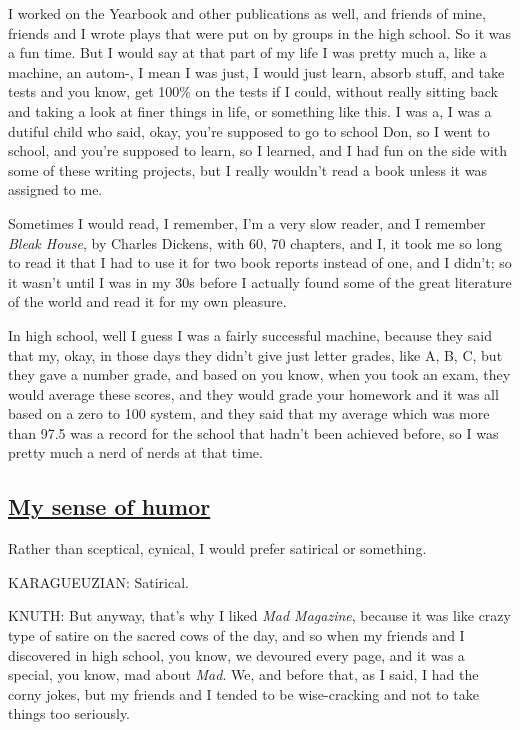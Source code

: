 \documentclass[]{article}
\begin{document}
I worked on the Yearbook and other publications as well, and friends of
mine, friends and I wrote plays that were put on by groups in the high
school. So it was a fun time. But I would say at that part of my life I
was pretty much a, like a machine, an autom-, I mean I was just, I would
just learn, absorb stuff, and take tests and you know, get 100\% on the
tests if I could, without really sitting back and taking a look at finer
things in life, or something like this. I was a, I was a dutiful child
who said, okay, you're supposed to go to school Don, so I went to
school, and you're supposed to learn, so I learned, and I had fun on the
side with some of these writing projects, but I really wouldn't read a
book unless it was assigned to me.

Sometimes I would read, I remember, I'm a very slow reader, and I
remember \emph{Bleak House}, by Charles Dickens, with 60, 70 chapters,
and I, it took me so long to read it that I had to use it for two book
reports instead of one, and I didn't; so it wasn't until I was in my 30s
before I actually found some of the great literature of the world and
read it for my own pleasure.

In high school, well I guess I was a fairly successful machine, because
they said that my, okay, in those days they didn't give just letter
grades, like A, B, C, but they gave a number grade, and based on you
know, when you took an exam, they would average these scores, and they
would grade your homework and it was all based on a zero to 100 system,
and they said that my average which was more than 97.5 was a record for
the school that hadn't been achieved before, so I was pretty much a nerd
of nerds at that time.

\subsection{\texorpdfstring{\href{http://webofstories.com/play/17066}{My
sense of humor}}{My sense of humor}}\label{my-sense-of-humor}

Rather than sceptical, cynical, I would prefer satirical or something.

KARAGUEUZIAN: Satirical.

KNUTH: But anyway, that's why I liked \emph{Mad Magazine}, because it
was like crazy type of satire on the sacred cows of the day, and so when
my friends and I discovered in high school, you know, we devoured every
page, and it was a special, you know, mad about \emph{Mad}. We, and
before that, as I said, I had the corny jokes, but my friends and I
tended to be wise-cracking and not to take things too seriously.
\end{document}
